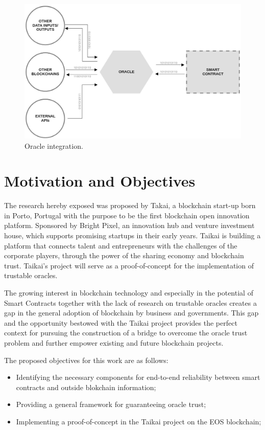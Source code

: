 \begin{figure}[t]
  \begin{center}
    \leavevmode
    \includegraphics[width=\textwidth]{figures/oracle.jpg}
    \caption{Oracle integration.}
    \label{fig:/figures/oracle.jpg}
  \end{center}
\end{figure}

\section{Motivation and Objectives} \label{sec:goals}
The research hereby exposed was proposed by Takai, a blockchain start-up born in Porto, Portugal with the purpose to be the first blockchain open innovation platform. Sponsored by Bright Pixel, an innovation hub and venture investment house, which supports promising startups in their early years. Taikai is building a platform that connects talent and entrepreneurs with the challenges of the corporate players, through the power of the sharing economy and blockchain trust. Taikai's project will serve as a proof-of-concept for the implementation of trustable oracles.

The growing interest in blockchain technology and especially in the potential of Smart Contracts together with the lack of research on trustable oracles creates a gap in the general adoption of blockchain by business and governments. This gap and the opportunity bestowed with the Taikai project provides the perfect context for pursuing the construction of a bridge to overcome the oracle trust problem and further empower existing and future blockchain projects.

The proposed objectives for this work are as follows:
\begin{itemize}
\item Identifying the necessary components for end-to-end reliability between smart contracts and outside blokchain information;
\item Providing a general framework for guaranteeing oracle trust;
\item Implementing a proof-of-concept in the Taikai project on the EOS blockchain;
\end{itemize}

